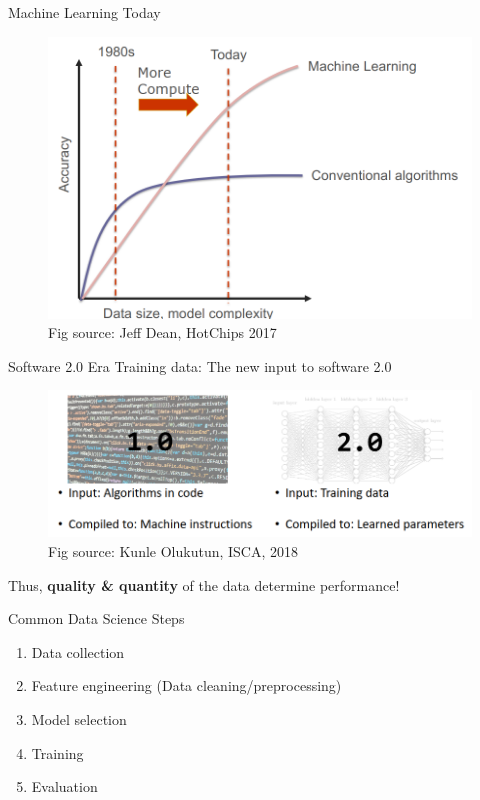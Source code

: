 \documentclass{../TexTemplate/myslide}
\begin{document}
\begin{frame}{Machine Learning Today}
\begin{figure}
\centering
\includegraphics[width=0.8\linewidth]{fig/ml_today.png}
\caption*{\small Fig source: Jeff Dean, HotChips 2017}
\end{figure}
\end{frame}

\begin{frame}{Software 2.0 Era}
Training data: The new input to software 2.0
\begin{figure}
\centering
\includegraphics[width=0.9\linewidth]{fig/software2.png}
\caption*{\small Fig source: Kunle Olukutun, ISCA, 2018}
\end{figure}
Thus, \textbf{quality \& quantity} of the data determine performance!
\end{frame}

\begin{frame}{Common Data Science Steps}
\begin{enumerate}
	\item Data collection
	\item Feature engineering (Data cleaning/preprocessing)
	\item Model selection
	\item Training
	\item Evaluation
\end{enumerate}
\end{frame}
\end{document}
